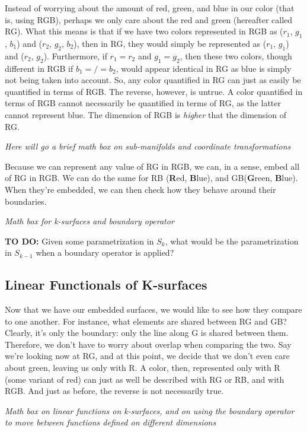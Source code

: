 \documentclass{book}
\begin{document}
Instead of worrying about the amount of red, green, and blue in our color (that is, using RGB), perhaps we only care about the red and green (hereafter called RG). What this means is that if we have two colors represented in RGB as ($r_{1}$, $g_{1}$, $b_{1}$) and ($r_{2}$, $g_{2}$, $b_{2}$), then in RG, they would simply be represented as ($r_{1}$, $g_{1}$) and ($r_{2}$, $g_{2}$). Furthermore, if $r_{1} = r_{2}$ and $g_{1} = g_{2}$, then these two colors, though different in RGB if $b_{1} =/= b_{2}$, would appear identical in RG as blue is simply not being taken into account. So, any color quantified in RG can just as easily be quantified in terms of RGB. The reverse, however, is untrue. A color quantified in terms of RGB cannot necessarily be quantified in terms of RG, as the latter cannot represent blue. The dimension of RGB is \textit{higher} that the dimension of RG. 

\emph{Here will go a brief math box on sub-manifolds and coordinate transformations}

Because we can represent any value of RG in RGB, we can, in a sense, embed all of RG in RGB. We can do the same for RB (\textbf{R}ed, \textbf{B}lue), and GB(\textbf{G}reen, \textbf{B}lue). When they're embedded, we can then check how they behave around their boundaries. 

\emph{Math box for k-surfaces and boundary operator}

\textbf{TO DO:} Given some parametrization in $S_{k}$, what would be the parametrization in $S_{k-1}$ when a boundary operator is applied?


\subsection{Linear Functionals of K-surfaces}
Now that we have our embedded surfaces, we would like to see how they compare to one another. For instance, what elements are shared between RG and GB? Clearly, it's only the boundary: only the line along G is shared between them. Therefore, we don't have to worry about overlap when comparing the two. 
Say we're looking now at RG, and at this point, we decide that we don't even care about green, leaving us only with R. A color, then, represented only with R (some variant of red) can just as well be described with RG or RB, and with RGB. And just as before, the reverse is not necessarily true. 

\emph{Math box on linear functions on k-surfaces, and on using the boundary operator to move between functions defined on different dimensions}
\end{document}
